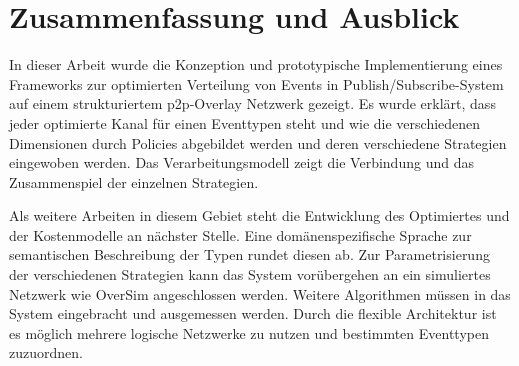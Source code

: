 \chapter{Zusammenfassung und Ausblick} 
\label{chap:zus}
In dieser Arbeit wurde die Konzeption und prototypische Implementierung eines Frameworks zur optimierten Verteilung von Events in Publish/Subscribe-System auf einem strukturiertem p2p-Overlay Netzwerk gezeigt. Es wurde erklärt, dass jeder optimierte Kanal für einen Eventtypen steht und wie die verschiedenen Dimensionen durch Policies abgebildet werden und deren verschiedene Strategien eingewoben werden. Das Verarbeitungsmodell zeigt die Verbindung und das Zusammenspiel der einzelnen Strategien.

Als weitere Arbeiten in diesem Gebiet steht die Entwicklung des Optimiertes und der Kostenmodelle an nächster Stelle. Eine domänenspezifische Sprache zur semantischen Beschreibung der Typen rundet diesen ab. Zur Parametrisierung der verschiedenen Strategien kann das System vorübergehen an ein simuliertes Netzwerk wie OverSim \cite{Baumgart2007OverSim} angeschlossen werden. Weitere Algorithmen müssen in das System eingebracht und ausgemessen werden. Durch die flexible Architektur ist es möglich mehrere logische Netzwerke zu nutzen und bestimmten Eventtypen zuzuordnen.

